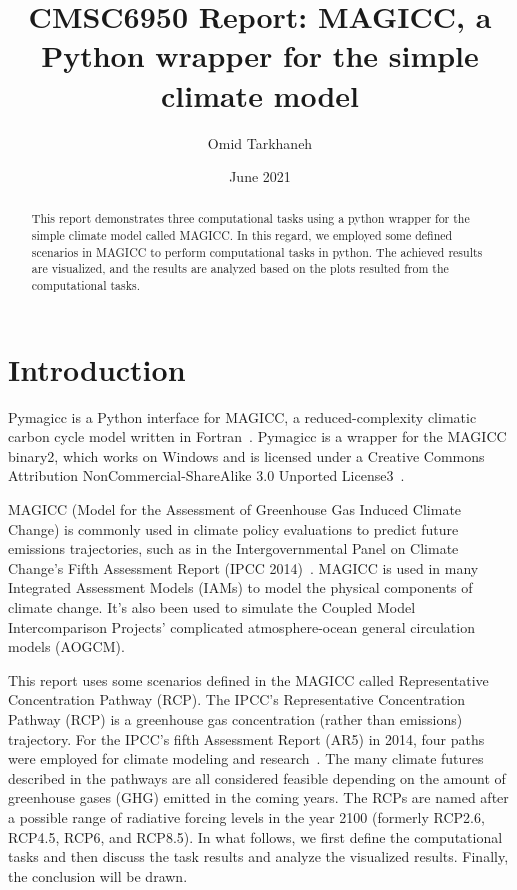 \documentclass[12pt]{article}
\title{CMSC6950 Report: MAGICC, a Python wrapper for the simple climate model  }
\date{June 2021}
\author{Omid Tarkhaneh}
\begin{document}
\maketitle


\begin{abstract}
This report demonstrates three computational tasks using a python wrapper for the simple climate model called MAGICC. In this regard, we employed some defined scenarios in MAGICC to perform computational tasks in python. The achieved results are visualized, and the results are analyzed based on the plots resulted from the computational tasks.
\end{abstract}






\section{Introduction} %
\label{sec:intro}
Pymagicc is a Python interface for MAGICC, a reduced-complexity climatic carbon cycle model written in Fortran~\cite{meinshausen2011emulating}. Pymagicc is a wrapper for the MAGICC binary2, which works on Windows and is licensed under a Creative Commons Attribution NonCommercial-ShareAlike 3.0 Unported License3~\cite{Gieseke2018}.

MAGICC (Model for the Assessment of Greenhouse Gas Induced Climate Change) is commonly used in climate policy evaluations to predict future emissions trajectories, such as in the Intergovernmental Panel on Climate Change's Fifth Assessment Report (IPCC 2014)~\cite{Gieseke2018}. MAGICC is used in many Integrated Assessment Models (IAMs) to model the physical components of climate change. It's also been used to simulate the Coupled Model Intercomparison Projects' complicated atmosphere-ocean general circulation models (AOGCM). 

This report uses some scenarios defined in the MAGICC called Representative Concentration Pathway (RCP).
The IPCC's Representative Concentration Pathway (RCP) is a greenhouse gas concentration (rather than emissions) trajectory. For the IPCC's fifth Assessment Report (AR5) in 2014, four paths were employed for climate modeling and research~\cite{moss2008towards}. The many climate futures described in the pathways are all considered feasible depending on the amount of greenhouse gases (GHG) emitted in the coming years. The RCPs are named after a possible range of radiative forcing levels in the year 2100 (formerly RCP2.6, RCP4.5, RCP6, and RCP8.5). In what follows, we first define the computational tasks and then discuss the task results and analyze the visualized results. Finally, the conclusion will be drawn.
\end{document}
